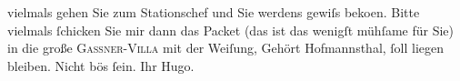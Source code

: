               vielmals gehen Sie zum Stationschef und Sie werdens gewiſs beko{\geminationm}en.
               Bitte vielmals ſchicken Sie mir dann das Packet (das ist das wenigſt mühſame für Sie)
                  {\pb}in die große \textsc{Gassner-Villa} mit der Weiſung, Gehört Hofmannsthal, ſoll liegen bleiben.\pend
           \pstart Nicht bös ſein. Ihr \spacefill\mbox{Hugo.}\pend{}\endnumbering{}  
      